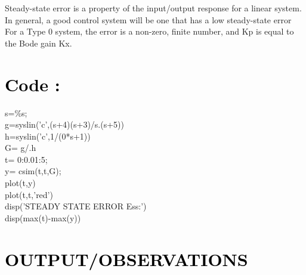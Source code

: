 \documentclass[12pt]{article}
\begin{document}
Steady-state error is a property of the input/output response for a linear system. In general, a good control system will be one that has a low steady-state error
For a Type 0 system, the error is a non-zero, finite number, and Kp is equal to the Bode gain Kx. \par

\section*{\textcolor{black}{Code :}}

   s=\%s;\\ 
   g=syslin('c',(s+4)(s+3)/s.(s+5))\\
   h=syslin('c',1/(0*s+1))\\
   G= g/.h\\
   t= 0:0.01:5;\\
   y= csim(t,t,G);\\
   plot(t,y)\\
    plot(t,t,'red')\\
   disp('STEADY STATE ERROR Ess:')\\
   disp(max(t)-max(y)) \par 

\section*{\textcolor{black}{OUTPUT/OBSERVATIONS}}
\end{document}
